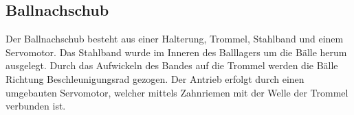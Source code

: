 \subsection{Ballnachschub}
Der Ballnachschub besteht aus einer Halterung, Trommel, Stahlband und einem 
Servomotor. Das Stahlband wurde im Inneren des Balllagers um die Bälle herum 
ausgelegt. Durch das Aufwickeln des Bandes auf die Trommel werden die Bälle 
Richtung Beschleunigungsrad gezogen. Der Antrieb erfolgt durch einen 
umgebauten Servomotor, welcher mittels Zahnriemen mit der Welle der Trommel 
verbunden ist.
